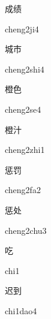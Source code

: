 \begin{verbete}[cheng2ji4]{成绩}
\begin{pronuncia}{cheng2ji4}
\end{pronuncia}
\end{verbete}

\begin{verbete}{城市}
\begin{pronuncia}{cheng2shi4}
\end{pronuncia}
\end{verbete}

\begin{verbete}[cheng2se4]{橙色}
\begin{pronuncia}{cheng2se4}
\end{pronuncia}
\end{verbete}

\begin{verbete}{橙汁}
\begin{pronuncia}{cheng2zhi1}
\end{pronuncia}
\end{verbete}

\begin{verbete}[cheng2fa2]{惩罚}
\begin{pronuncia}{cheng2fa2}
\end{pronuncia}
\end{verbete}

\begin{verbete}{惩处}
\begin{pronuncia}{cheng2chu3}
\end{pronuncia}
\end{verbete}

\begin{verbete}[chi1]{吃}
\begin{pronuncia}{chi1}
\end{pronuncia}
\end{verbete}

\begin{verbete}{迟到}
\begin{pronuncia}{chi1dao4}
\end{pronuncia}
\end{verbete}

